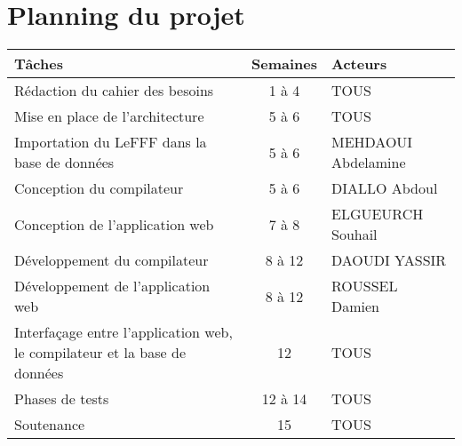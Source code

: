 
\section{Planning du projet}

 \begin{tabularx}{\textwidth}{|p{7cm}|c|X|}
    \hline
    \textbf{Tâches} & 
    \textbf{Semaines} & 
    \textbf{Acteurs} \tabularnewline
    \hline
    Rédaction du cahier des besoins & 1 à 4 & TOUS \tabularnewline
    \hline
    Mise en place de l'architecture   & 5 à 6  & TOUS \tabularnewline
    \hline
    Importation du LeFFF dans la base de données  & 5 à 6 & MEHDAOUI Abdelamine \tabularnewline
    \hline
    Conception du compilateur & 5 à 6 & DIALLO Abdoul \tabularnewline
    \hline
    Conception de l'application web & 7 à 8 & ELGUEURCH Souhail  \tabularnewline
    \hline
    Développement du compilateur & 8 à 12 & DAOUDI YASSIR \tabularnewline
    \hline
    Développement de l'application web & 8 à 12 & ROUSSEL Damien \tabularnewline
    \hline
    Interfaçage entre l'application web, le compilateur et la base de données & 12 & TOUS \tabularnewline
    \hline
    Phases de tests  & 12 à 14 & TOUS \tabularnewline
   \hline
    Soutenance & 15 & TOUS \tabularnewline
   \hline
\end{tabularx}


